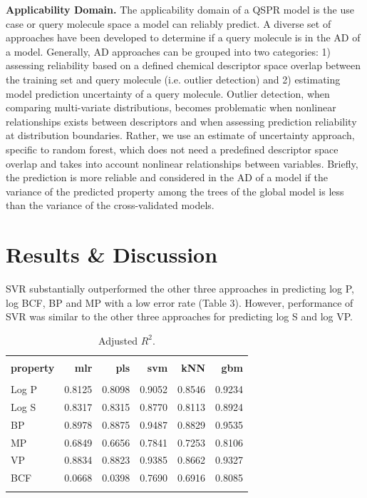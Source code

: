 \documentclass[10pt, letter]{article}
\renewcommand{\=}{\, =\, }
\newcommand{\+}{\, +\, }
\renewcommand{\-}{\, -\, }
\begin{document}
\textbf{Applicability Domain.} The applicability domain of a QSPR model is the use case or query molecule space a model can
reliably predict. A diverse set of approaches have been developed to determine if a query molecule
is in the AD of a model. Generally, AD approaches can be grouped into two categories:
1) assessing reliability based on a defined chemical descriptor space overlap between
the training set and query molecule (i.e. outlier detection) and 2) estimating model prediction
uncertainty of a query molecule. Outlier detection, when comparing multi-variate
distributions, becomes problematic when nonlinear relationships exists between
descriptors and when assessing prediction reliability at distribution boundaries. Rather, we use
an estimate of uncertainty approach, specific to random forest, which does not need a predefined
descriptor space overlap and takes into account nonlinear relationships between variables. Briefly, the prediction is more reliable
and considered in the AD of a model if the
variance of the predicted property among the trees of the global model is less than the variance
of the cross-validated models.

\section{Results \& Discussion}

SVR substantially outperformed the other three approaches in predicting log P, log
BCF, BP and MP with a low error rate (Table 3). However, performance of SVR
was similar to the other three approaches for predicting log S and log VP.

\begin{table}[H]
\begin{center}
\begin{tabular}{lrrrrr}
\toprule
&&\\
{\bf property} & {\bf mlr} & {\bf pls} &  {\bf svm}  & {\bf kNN}  & {\bf gbm}\\
\midrule
&&\\
Log P  &   0.8125 & 0.8098 & 0.9052 & 0.8546 & 0.9234\\
Log S  &   0.8317 & 0.8315 & 0.8770 & 0.8113 & 0.8924\\
BP  &   0.8978 & 0.8875 & 0.9487 & 0.8829 & 0.9535\\
MP  &   0.6849 & 0.6656 & 0.7841 & 0.7253 & 0.8106\\
VP  &   0.8834 & 0.8823 & 0.9385 & 0.8662 & 0.9327\\
BCF  &   0.0668 & 0.0398 & 0.7690 & 0.6916 & 0.8085\\
&&\\
\bottomrule
\end{tabular}
\end{center}
\caption{Adjusted \( R^2\).}
\end{table}
\end{document}
